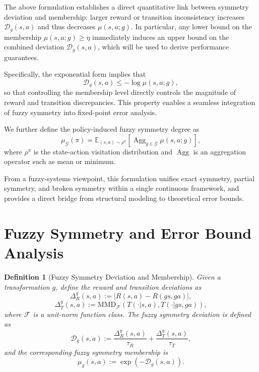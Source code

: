 \documentclass[lettersize,journal]{IEEEtran}
\newtheorem{definition}{Definition}
\newcommand{\E}{\mathbb{E}}
\newcommand{\Acal}{\mathcal}
\begin{document}
The above formulation establishes a direct quantitative link between symmetry deviation and membership: larger reward or transition inconsistency increases $\mathcal D_g(s,a)$ and thus decreases $\mu(s,a;g)$. In particular, any lower bound on the membership $\mu(s,a;g)\ge \eta$ immediately induces an upper bound on the combined deviation $\mathcal D_g(s,a)$, which will be used to derive performance guarantees.

Specifically, the exponential form implies that
\[
\mathcal D_g(s,a) \le -\log \mu(s,a;g),
\]
so that controlling the membership level directly controls the magnitude of reward and transition discrepancies. This property enables a seamless integration of fuzzy symmetry into fixed-point error analysis.

We further define the policy-induced fuzzy symmetry degree as
\begin{equation}
\mu_{\Acal{G}}(\pi)
=
\E_{(s,a)\sim \rho^\pi}
\left[
\operatorname{Agg}_{g\in\Acal{G}} \mu(s,a;g)
\right],
\label{eq:policy-membership}
\end{equation}
where $\rho^\pi$ is the state-action visitation distribution and $\operatorname{Agg}$ is an aggregation operator such as mean or minimum.

From a fuzzy-systems viewpoint, this formulation unifies exact symmetry, partial symmetry, and broken symmetry within a single continuous framework, and provides a direct bridge from structural modeling to theoretical error bounds.


\section{Fuzzy Symmetry and Error Bound Analysis}

\begin{definition}[Fuzzy Symmetry Deviation and Membership]
Given a transformation $g$, define the reward and transition deviations as
\begin{equation}
    \Delta_R^g(s,a) := |R(s,a) - R(gs,ga)|,
\end{equation}
\begin{equation}
    \Delta_T^g(s,a) := \mathrm{MMD}_{\mathcal F}\!\left(T(\cdot|s,a), T(\cdot|gs,ga)\right),
\end{equation}
where $\mathcal F$ is a unit-norm function class. The fuzzy symmetry deviation is defined as
\begin{equation}
    \mathcal D_g(s,a) := \frac{\Delta_R^g(s,a)}{\tau_R} + \frac{\Delta_T^g(s,a)}{\tau_T},
\end{equation}
and the corresponding fuzzy symmetry membership is
\begin{equation}
    \mu_g(s,a) := \exp(-\mathcal D_g(s,a)).
\end{equation}
\end{definition}
\end{document}

